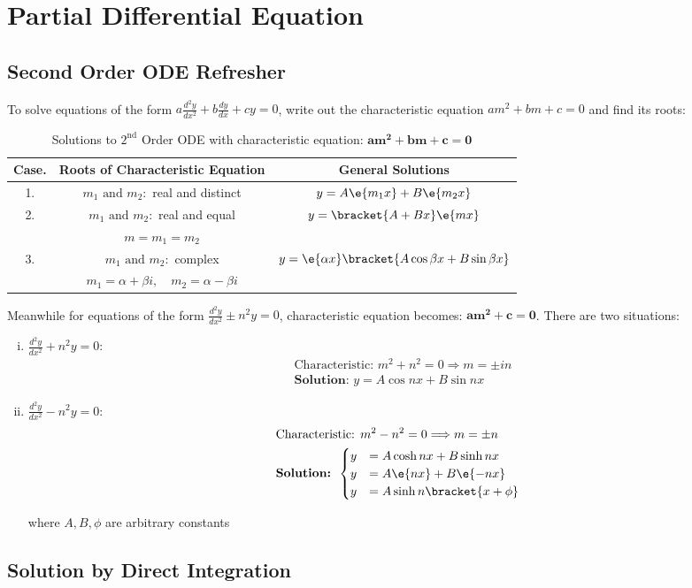 \section{Partial Differential Equation}
\subsection{Second Order ODE Refresher}
To solve equations of the form $\displaystyle a\frac{d^2y}{dx^2}+b\frac{dy}{dx}+cy=0$, write out the characteristic equation $\displaystyle am^2+bm+c=0$ and find its roots:
\begin{table}[H]
    \centering
    \renewcommand{\arraystretch}{2.2}
    \caption{Solutions to $2^\text{nd}$ Order ODE with characteristic equation: $\mathbf{am^2+bm+c=0}$}
    \label{table:5.1}
    \begin{tabular}{|c|c|c|}\hline
       Case.&Roots of Characteristic Equation&General Solutions\\\hline
       1.&$m_1\text{ and }m_2:$ real and distinct&$y=A\e{m_1x}+B\e{m_2x}$\\\hline
       2.&$m_1\text{ and }m_2:$ real and equal&$y=\bracket{A+Bx}\e{mx}$\\
        &$m=m_1=m_2$& \\\hline
       3.&$m_1\text{ and }m_2:$ complex& $y=\e{\alpha x}\bracket{A\cos\beta x+B\sin \beta x}$\\
        &$m_1=\alpha+\beta i,\quad m_2=\alpha-\beta i$& \\\hline
    \end{tabular}
\end{table}
\noindent \noindent Meanwhile for equations of the form $\displaystyle \frac{d^2y}{dx^2}\pm n^2y=0$, characteristic equation becomes: $\mathbf{am^2+c=0}$. There are two situations:
\begin{enumerate}[i.]
    \item $\displaystyle \frac{d^2y}{dx^2}+n^2y=0:$
    \begin{align}
        &\text{Characteristic: }m^2+n^2=0\Longrightarrow m=\pm in\nonumber\\
        &\textbf{Solution: }y=A\cos nx+B\sin nx
    \end{align}
    \item $\displaystyle \frac{d^2y}{dx^2}-n^2y=0:$
    \begin{align}
        &\text{Characteristic: }m^2-n^2=0\Longrightarrow m=\pm n\nonumber\\
        &\textbf{Solution: }\begin{cases}
            y&=A\cosh nx+B\sinh nx\\
            y&=A\e{nx}+B\e{-nx}\\
            y&=A\sinh{n\bracket{x+\phi}}
        \end{cases}
    \end{align}
    \begin{center}
        where $A,B,\phi$ are arbitrary constants
    \end{center}
\end{enumerate}
\subsection{Solution by Direct Integration}
